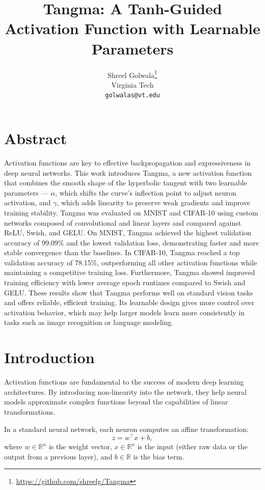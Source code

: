 \documentclass{article}
\title{Tangma: A Tanh-Guided Activation Function with Learnable Parameters}
\author{
   Shreel Golwala\footnote{\protect\url{https://github.com/shreelg/Tangma}} \\
  Virginia Tech \\
  \texttt{golwalas@vt.edu} \\
  \vspace{0.3em}
}
\date{}
\begin{document}
\maketitle
\vspace{-7pt}

\section{Abstract}

Activation functions are key to effective backpropagation and expressiveness in deep neural networks. This work introduces Tangma, a new activation function that combines the smooth shape of the hyperbolic tangent with two learnable parameters --- $\alpha$, which shifts the curve’s inflection point to adjust neuron activation, and $\gamma$, which adds linearity to preserve weak gradients and improve training stability. Tangma was evaluated on MNIST and CIFAR-10 using custom networks composed of convolutional and linear layers and compared against ReLU, Swish, and GELU. On MNIST, Tangma achieved the highest validation accuracy of 99.09\% and the lowest validation loss, demonstrating faster and more stable convergence than the baselines. In CIFAR-10, Tangma reached a top validation accuracy of 78.15\%, outperforming all other activation functions while maintaining a competitive training loss. Furthermore, Tangma showed improved training efficiency with lower average epoch runtimes compared to Swish and GELU. These results show that Tangma performs well on standard vision tasks and offers reliable, efficient training. Its learnable design gives more control over activation behavior, which may help larger models learn more consistently in tasks such as image recognition or language modeling.





\section{Introduction}
\vspace{2pt}


\noindent
Activation functions are fundamental to the success of modern deep learning architectures. By introducing non-linearity into the network, they help neural models approximate complex functions beyond the capabilities of linear transformations. 

\vspace{4pt}

\noindent
In a standard neural network, each neuron computes an affine transformation:
\[
z = w^\top x + b,
\]
where \( w \in \mathbb{R}^n \) is the weight vector, \( x \in \mathbb{R}^n \) is the input (either raw data or the output from a previous layer), and \( b \in \mathbb{R} \) is the bias term.
\end{document}
